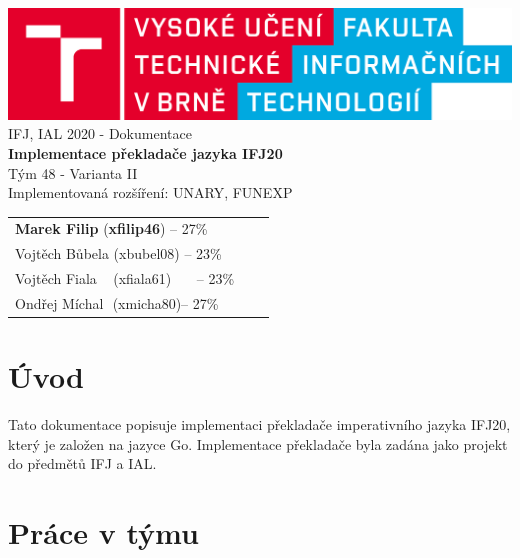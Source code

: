 \documentclass[12pt]{article}
\begin{document}
	\begin{titlepage}
		\begin{center}
			\includegraphics[scale=0.15]{fit_logo.png}
			\\
			{\Large
				 \huge{{IFJ, IAL 2020 - Dokumentace\\[0.5em]}}}
				 {\Huge\textbf{{Implementace překladače jazyka IFJ20}}}\\[0.5em]
				 \huge{Tým 48 - Varianta II}\\[0.5em]
				 \smallskip
				 \LARGE{Implementovaná rozšíření: UNARY, FUNEXP}
			\\
		{\Large
			\begin{tabular}{l c r}           %
            \textbf{Marek Filip} \hspace{1em}(\textbf{xfilip46})\hspace{1.61em} -- 27\% \\
            Vojtěch Bůbela (xbubel08)\hspace{1.03em} -- 23\% \\
            Vojtěch Fiala \,\,\,\,\,(xfiala61)\,\,\,\,\,\,\,\,\, -- 23\% \\
            Ondřej Míchal \,\,(xmicha80)\quad -- 27\% \\
            \end{tabular}
			
		}
		\end{center}
	\end{titlepage}
    
    \tableofcontents
    
    \newpage
    \section{Úvod}
    \large{Tato dokumentace popisuje implementaci překladače imperativního jazyka IFJ20, který je založen na jazyce Go. Implementace překladače byla zadána jako projekt do předmětů IFJ a IAL.}
    \section{Práce v týmu}
    
\end{document}
